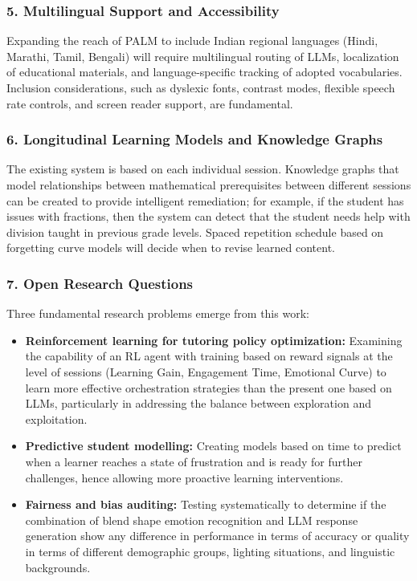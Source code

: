 \documentclass[conference, letterpaper]{IEEEtran}
\begin{document}
\subsubsection*{5. Multilingual Support and Accessibility}

Expanding the reach of PALM to include Indian regional languages (Hindi, Marathi, Tamil, Bengali) will require multilingual routing of LLMs, localization of educational materials, and language-specific tracking of adopted vocabularies. Inclusion considerations, such as dyslexic fonts, contrast modes, flexible speech rate controls, and screen reader support, are fundamental.

\subsubsection*{6. Longitudinal Learning Models and Knowledge Graphs}

The existing system is based on each individual session. Knowledge graphs that model relationships between mathematical prerequisites between different sessions can be created to provide intelligent remediation; for example, if the student has issues with fractions, then the system can detect that the student needs help with division taught in previous grade levels. Spaced repetition schedule based on forgetting curve models will decide when to revise learned content.\\

\subsubsection*{7. Open Research Questions}

Three fundamental research problems emerge from this work:

\begin{itemize}[nosep]
    \item \textbf{Reinforcement learning for tutoring policy optimization:} Examining the capability of an RL agent with training based on reward signals at the level of sessions (Learning Gain, Engagement Time, Emotional Curve) to learn more effective orchestration strategies than the present one based on LLMs, particularly in addressing the balance between exploration and exploitation.
    \item \textbf{Predictive student modelling:} Creating models based on time to predict when a learner reaches a state of frustration and is ready for further challenges, hence allowing more proactive learning interventions.
    \item \textbf{Fairness and bias auditing:} Testing systematically to determine if the combination of blend shape emotion recognition and LLM response generation show any difference in performance in terms of accuracy or quality in terms of different demographic groups, lighting situations, and linguistic backgrounds.
\end{itemize}
\end{document}
